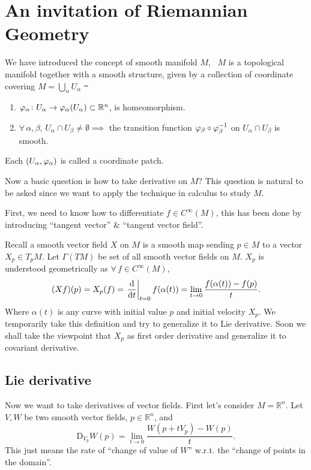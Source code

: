 \section{An invitation of Riemannian Geometry}
We have introduced the concept of smooth manifold \(M\), \ie\ \(M\) is a
topological manifold together with a smooth structure, given by a collection
of coordinate covering \(M=\bigcup_{\alpha}U_\alpha\) \st\ 
\begin{enumerate}[(1)]
    \item \(\varphi_\alpha\colon U_\alpha\to \varphi_\alpha(U_\alpha)\subset
        \mathbb{R}^n\), is homeomorphism.
    \item \(\forall\,\alpha,\beta\), \(U_\alpha\cap U_\beta\neq\emptyset
        \implies\) the transition function \(\varphi_\beta\circ \varphi_\beta^{-1}\)
        on \(U_{\alpha}\cap U_\beta\) is smooth.
\end{enumerate}
Each \((U_\alpha,\varphi_\alpha)\) is called a coordinate patch.

Now a basic question is how to take derivative on \(M\)? This question is
natural to be asked since we want to apply the technique in calculus to study
\(M\).

First, we need to know how to differentiate \(f\in C^\infty(M)\), this has been
done by introducing ``tangent vector'' \& ``tangent vector field''.

Recall a smooth vector field \(X\) on \(M\) is a smooth map sending \(p\in M\)
to a vector \(X_p\in T_pM\). Let \(\Gamma(TM)\) be set of all smooth vector
fields on \(M\). \(X_p\) is understood geometrically as \(\forall\,f\in C^\infty
(M)\), \[
    (Xf)(p)=X_p(f)=\eval{\dv{t}}_{t=0}f(\alpha(t))
    =\lim_{t\to 0}\frac{f(\alpha(t))-f(p)}{t}
.\] Where \(\alpha(t)\) is any curve with initial value \(p\) and initial
velocity \(X_p\). We temporarily take this definition and try to generalize
it to Lie derivative. Soon we shall take the viewpoint that \(X_p\) as first
order derivative and generalize it to covariant derivative.

\subsection{Lie derivative}
Now we want to take derivatives of vector fields. First let's consider \(M=
\mathbb{R}^n\). Let \(V,W\) be two smooth vector fields, \(p\in \mathbb{R}^n\),
and
\begin{equation}\label{eq:lie-diff-Rn}
    \mathrm{D}_{V_p}W(p)=\lim_{t\to 0}\frac{W(p+tV_p)-W(p)}{t}
.\end{equation}
This just means the rate of ``change of value of \(W\)'' w.r.t. the ``change
of points in the domain''.

